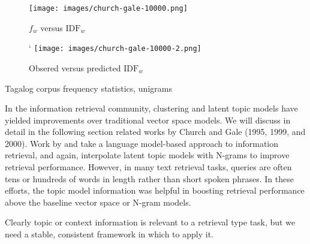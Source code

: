 \documentclass[11pt]{article}
\begin{document}
\nocite{Jelinek1997,kuhn1990,kneser1993,chiu-rudnicky-2013}

\begin{figure*}[tb!]
\centering
\begin{subfigure}[b]{0.45\linewidth}

  \texttt{[image: images/church-gale-10000.png]}

	\begin{caption}{$f_w$ versus $\mathrm{IDF}_w$ \label{tfidf1}}
	\end{caption}
	\end{subfigure}	
	\begin{subfigure}[b]{0.45\linewidth}
	\centering`
 \texttt{[image: images/church-gale-10000-2.png]}
  \begin{caption}{Obsered versus predicted $\mathrm{IDF}_w$}
    \label{idf}
  \end{caption}
\end{subfigure}	
\begin{caption}{Tagalog corpus frequency statistics, unigrams}
\end{caption}
\end{figure*}


In the information retrieval community, clustering and latent topic models have yielded improvements over traditional vector space models.  We will discuss in detail in the following section related works by Church and Gale (1995, 1999, and 2000).  Work by  and  take a language model-based approach to information retrieval, and again, interpolate latent topic models with N-grams to improve retrieval performance.   However, in many text retrieval tasks, queries are often tens or hundreds of words in length rather than short spoken phrases.  In these efforts, the topic model information was helpful in boosting retrieval performance above the baseline vector space or N-gram models.

\nocite{church1995poisson,church1999,church2000}
Clearly topic or context information is relevant to a retrieval type task, but we need a stable, consistent framework in which to apply it.
\end{document}
